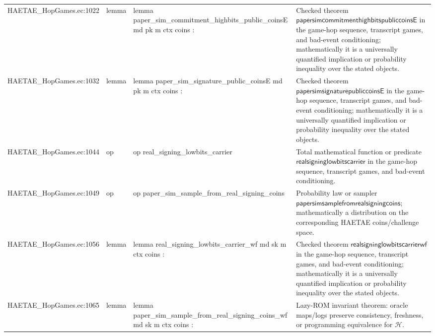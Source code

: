 \documentclass[10pt]{article}
\begin{document}
\begin{longtable}{L{0.11\textwidth}L{0.055\textwidth}L{0.385\textwidth}L{0.41\textwidth}}
HAETAE\_\allowbreak{}HopGames.\allowbreak{}ec:\allowbreak{}1022 & lemma & {\ttfamily\scriptsize lemma paper\_\allowbreak{}sim\_\allowbreak{}commitment\_\allowbreak{}highbits\_\allowbreak{}public\_\allowbreak{}coinsE md pk m ctx coins :} & Checked theorem $\mathsf{papersimcommitmenthighbitspubliccoinsE}$ in the game-hop sequence, transcript games, and bad-event conditioning; mathematically it is a universally quantified implication or probability inequality over the stated objects. \\
HAETAE\_\allowbreak{}HopGames.\allowbreak{}ec:\allowbreak{}1032 & lemma & {\ttfamily\scriptsize lemma paper\_\allowbreak{}sim\_\allowbreak{}signature\_\allowbreak{}public\_\allowbreak{}coinsE md pk m ctx coins :} & Checked theorem $\mathsf{papersimsignaturepubliccoinsE}$ in the game-hop sequence, transcript games, and bad-event conditioning; mathematically it is a universally quantified implication or probability inequality over the stated objects. \\
HAETAE\_\allowbreak{}HopGames.\allowbreak{}ec:\allowbreak{}1044 & op & {\ttfamily\scriptsize op real\_\allowbreak{}signing\_\allowbreak{}lowbits\_\allowbreak{}carrier} & Total mathematical function or predicate $\mathsf{realsigninglowbitscarrier}$ in the game-hop sequence, transcript games, and bad-event conditioning. \\
HAETAE\_\allowbreak{}HopGames.\allowbreak{}ec:\allowbreak{}1049 & op & {\ttfamily\scriptsize op paper\_\allowbreak{}sim\_\allowbreak{}sample\_\allowbreak{}from\_\allowbreak{}real\_\allowbreak{}signing\_\allowbreak{}coins} & Probability law or sampler $\mathsf{papersimsamplefromrealsigningcoins}$; mathematically a distribution on the corresponding HAETAE coins/challenge space. \\
HAETAE\_\allowbreak{}HopGames.\allowbreak{}ec:\allowbreak{}1056 & lemma & {\ttfamily\scriptsize lemma real\_\allowbreak{}signing\_\allowbreak{}lowbits\_\allowbreak{}carrier\_\allowbreak{}wf md sk m ctx coins :} & Checked theorem $\mathsf{realsigninglowbitscarrierwf}$ in the game-hop sequence, transcript games, and bad-event conditioning; mathematically it is a universally quantified implication or probability inequality over the stated objects. \\
HAETAE\_\allowbreak{}HopGames.\allowbreak{}ec:\allowbreak{}1065 & lemma & {\ttfamily\scriptsize lemma paper\_\allowbreak{}sim\_\allowbreak{}sample\_\allowbreak{}from\_\allowbreak{}real\_\allowbreak{}signing\_\allowbreak{}coins\_\allowbreak{}wf md sk m ctx coins :} & Lazy-ROM invariant theorem: oracle maps/logs preserve consistency, freshness, or programming equivalence for $\mathcal H$. \\

\end{longtable}
\end{document}
